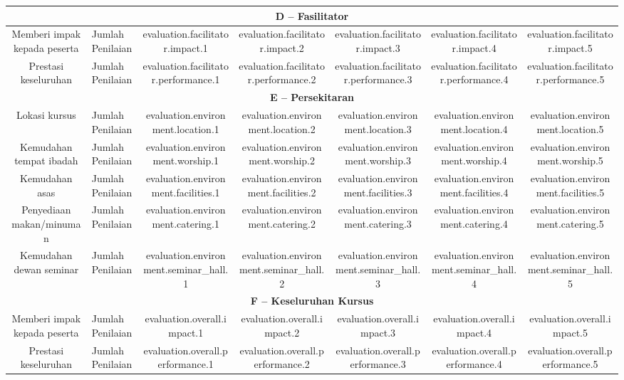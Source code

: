\documentclass[a4paper,12pt]{article}
\begin{document}
\begin{tabular}{|c|p{6cm}|c|c|c|c|c|}
    \hline
    \multicolumn{7}{|c|}{\textbf{D – Fasilitator}} \\
    \hline
    Memberi impak kepada peserta & Jumlah Penilaian & {{evaluation.facilitator.impact.1}} & {{evaluation.facilitator.impact.2}} & {{evaluation.facilitator.impact.3}} & {{evaluation.facilitator.impact.4}} & {{evaluation.facilitator.impact.5}} \\
    \hline
    Prestasi keseluruhan & Jumlah Penilaian & {{evaluation.facilitator.performance.1}} & {{evaluation.facilitator.performance.2}} & {{evaluation.facilitator.performance.3}} & {{evaluation.facilitator.performance.4}} & {{evaluation.facilitator.performance.5}} \\
    \hline
    \multicolumn{7}{|c|}{\textbf{E – Persekitaran}} \\
    \hline
    Lokasi kursus & Jumlah Penilaian & {{evaluation.environment.location.1}} & {{evaluation.environment.location.2}} & {{evaluation.environment.location.3}} & {{evaluation.environment.location.4}} & {{evaluation.environment.location.5}} \\
    \hline
    Kemudahan tempat ibadah & Jumlah Penilaian & {{evaluation.environment.worship.1}} & {{evaluation.environment.worship.2}} & {{evaluation.environment.worship.3}} & {{evaluation.environment.worship.4}} & {{evaluation.environment.worship.5}} \\
    \hline
    Kemudahan asas & Jumlah Penilaian & {{evaluation.environment.facilities.1}} & {{evaluation.environment.facilities.2}} & {{evaluation.environment.facilities.3}} & {{evaluation.environment.facilities.4}} & {{evaluation.environment.facilities.5}} \\
    \hline
    Penyediaan makan/minuman & Jumlah Penilaian & {{evaluation.environment.catering.1}} & {{evaluation.environment.catering.2}} & {{evaluation.environment.catering.3}} & {{evaluation.environment.catering.4}} & {{evaluation.environment.catering.5}} \\
    \hline
    Kemudahan dewan seminar & Jumlah Penilaian & {{evaluation.environment.seminar_hall.1}} & {{evaluation.environment.seminar_hall.2}} & {{evaluation.environment.seminar_hall.3}} & {{evaluation.environment.seminar_hall.4}} & {{evaluation.environment.seminar_hall.5}} \\
    \hline
    \multicolumn{7}{|c|}{\textbf{F – Keseluruhan Kursus}} \\
    \hline
    Memberi impak kepada peserta & Jumlah Penilaian & {{evaluation.overall.impact.1}} & {{evaluation.overall.impact.2}} & {{evaluation.overall.impact.3}} & {{evaluation.overall.impact.4}} & {{evaluation.overall.impact.5}} \\
    \hline
    Prestasi keseluruhan & Jumlah Penilaian & {{evaluation.overall.performance.1}} & {{evaluation.overall.performance.2}} & {{evaluation.overall.performance.3}} & {{evaluation.overall.performance.4}} & {{evaluation.overall.performance.5}} \\
    \hline
\end{tabular}
\end{document}
